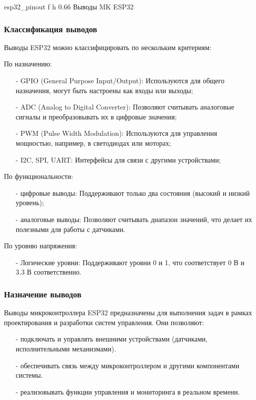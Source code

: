 \documentclass{bmstu}
\begin{document}
    {esp32_pinout} %
    {f} %
    {h} %
    {0.66\textwidth} %
    {Выводы MK ESP32} %


    \subsubsection{Классификация выводов}
    Выводы ESP32 можно классифицировать по нескольким критериям:

    По назначению:
    \begin{itemize}
        \item[-] GPIO (General Purpose Input/Output): Используются для общего назначения, могут быть настроены как входы или выходы;
        \item[-] ADC (Analog to Digital Converter): Позволяют считывать аналоговые сигналы и преобразовывать их в цифровые значения;
        \item[-] PWM (Pulse Width Modulation): Используются для управления мощностью, например, в светодиодах или моторах;
        \item[-] I2C, SPI, UART: Интерфейсы для связи с другими устройствами;
    \end{itemize}

    По функциональности:
    \begin{itemize}
        \item[-] цифровые выводы: Поддерживают только два состояния (высокий и низкий уровень);
        \item[-] аналоговые выводы: Позволяют считывать диапазон значений, что делает их полезными для работы с датчиками.
    \end{itemize}

    По уровню напряжения:
    \begin{itemize}
        \item[-] Логические уровни: Поддерживают уровни 0 и 1, что соответствует 0 В и 3.3 В соответственно.
    \end{itemize}

    \subsubsection{Назначение выводов}
    Выводы микроконтроллера ESP32 предназначены для выполнения задач в рамках проектирования и разработки систем управления. Они позволяют:
    \begin{itemize}
        \item[-] подключать и управлять внешними устройствами (датчиками, исполнительными механизмами).
        \item[-] обеспечивать связь между микроконтроллером и другими компонентами системы.
        \item[-] реализовывать функции управления и мониторинга в реальном времени.
    \end{itemize}
\end{document}
